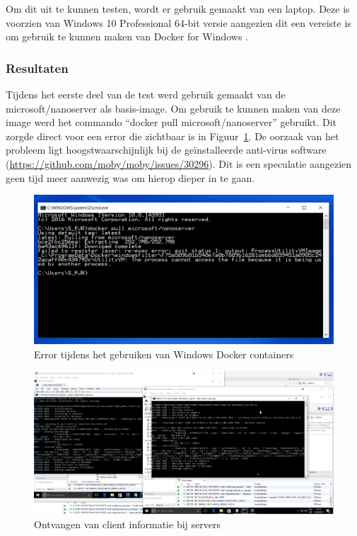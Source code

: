 Om dit uit te kunnen testen, wordt er gebruik gemaakt van een laptop.
Deze is voorzien van Windows 10 Professional 64-bit versie aangezien dit een vereiste is om gebruik te kunnen maken van Docker for Windows \citep{dockerWindows}.

\subsubsection{Resultaten}
Tijdens het eerste deel van de test werd gebruik gemaakt van de microsoft/nanoserver als basis-image.
Om gebruik te kunnen maken van deze image werd het commando ``docker pull microsoft/nanoserver'' gebruikt.
Dit zorgde direct voor een error die zichtbaar is in Figuur~\ref{fig:testContainer:crosscontainer}.
De oorzaak van het probleem ligt hoogstwaarschijnlijk bij de geïnstalleerde anti-virus software (\url{https://github.com/moby/moby/issues/30296}).
Dit is een speculatie aangezien geen tijd meer aanwezig was om hierop dieper in te gaan.

\begin{figure}
\centering
\includegraphics[width=\textwidth,height=\textheight,keepaspectratio]{afbeelding/testCrossContainer/bad_cut.png}
\caption{Error tijdens het gebruiken van Windows Docker containers}
\label{fig:testContainer:crosscontainer}
\end{figure}

\begin{figure}
\centering
\includegraphics[width=\textwidth,height=\textheight,keepaspectratio]{afbeelding/testMultiServer/receivedSetup.png}
\caption{Ontvangen van client informatie bij servers}
\label{fig:testServer:receiveSetup}
\end{figure}

